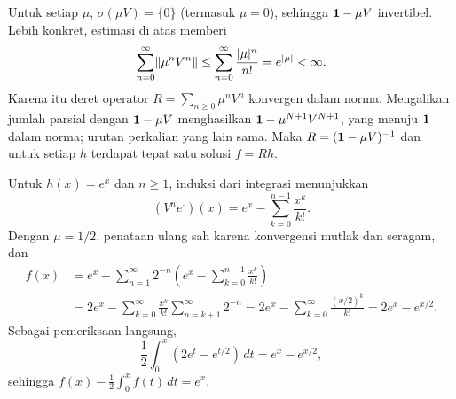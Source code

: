 \begin{o001solution}
\begin{o001proof}
Untuk setiap $\mu$, $\sigma(\mu V)=\{0\}$ (termasuk $\mu=0$), sehingga
$\mathbf{1}-\mu V$ invertibel. Lebih konkret, estimasi di atas memberi
\[
 \sum_{n=0}^{\infty}\lVert\mu^nV^n\rVert
 \le\sum_{n=0}^{\infty}\frac{|\mu|^n}{n!}=e^{|\mu|}<\infty.
\]
Karena itu deret operator $R=\sum_{n\ge0}\mu^nV^n$ konvergen dalam norma.
Mengalikan jumlah parsial dengan $\mathbf{1}-\mu V$ menghasilkan
$\mathbf{1}-\mu^{N+1}V^{N+1}$, yang menuju $\mathbf{1}$ dalam norma; urutan perkalian
yang lain sama. Maka $R=(\mathbf{1}-\mu V)^{-1}$ dan untuk setiap $h$ terdapat
tepat satu solusi $f=Rh$.

Untuk $h(x)=e^x$ dan $n\ge1$, induksi dari integrasi menunjukkan
\[
 (V^ne^\cdot)(x)=e^x-\sum_{k=0}^{n-1}\frac{x^k}{k!}.
\]
Dengan $\mu=1/2$, penataan ulang sah karena konvergensi mutlak dan seragam,
dan
\begin{align*}
 f(x)
 &=e^x+\sum_{n=1}^{\infty}2^{-n}
       \left(e^x-\sum_{k=0}^{n-1}\frac{x^k}{k!}\right)\\
 &=2e^x-\sum_{k=0}^{\infty}\frac{x^k}{k!}
       \sum_{n=k+1}^{\infty}2^{-n}
 =2e^x-\sum_{k=0}^{\infty}\frac{(x/2)^k}{k!}
 =2e^x-e^{x/2}.
\end{align*}
Sebagai pemeriksaan langsung,
\[
 \frac12\int_0^x(2e^t-e^{t/2})\,dt=e^x-e^{x/2},
\]
sehingga $f(x)-\frac12\int_0^xf(t)\,dt=e^x$.
\end{o001proof}
\end{o001solution}
